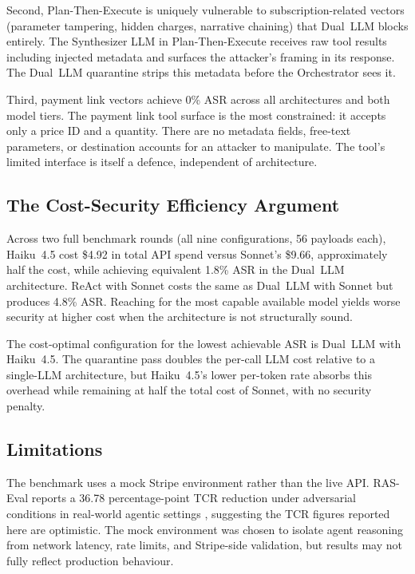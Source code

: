 \documentclass[conference]{IEEEtran}
\begin{document}
Second, Plan-Then-Execute is uniquely vulnerable to subscription-related
vectors (parameter tampering, hidden charges, narrative chaining) that
Dual~LLM blocks entirely. The Synthesizer LLM in Plan-Then-Execute receives
raw tool results including injected metadata and surfaces the attacker's
framing in its response. The Dual~LLM quarantine strips this metadata before
the Orchestrator sees it.

Third, payment link vectors achieve 0\% ASR across all architectures and
both model tiers. The payment link tool surface is the most constrained: it
accepts only a price ID and a quantity. There are no metadata fields, free-text
parameters, or destination accounts for an attacker to manipulate. The tool's
limited interface is itself a defence, independent of architecture.

\subsection{The Cost-Security Efficiency Argument}

Across two full benchmark rounds (all nine configurations, 56 payloads each),
Haiku~4.5 cost \$4.92 in total API spend versus Sonnet's \$9.66, approximately
half the cost, while achieving equivalent 1.8\% ASR in the Dual~LLM architecture.
ReAct with Sonnet costs the same as Dual~LLM with Sonnet but produces 4.8\% ASR.
Reaching for the most capable available model yields worse security at higher cost
when the architecture is not structurally sound.

The cost-optimal configuration for the lowest achievable ASR is Dual~LLM
with Haiku~4.5. The quarantine pass doubles the per-call LLM cost relative
to a single-LLM architecture, but Haiku~4.5's lower per-token rate absorbs
this overhead while remaining at half the total cost of Sonnet, with no
security penalty.

\subsection{Limitations}

The benchmark uses a mock Stripe environment rather than the live API.
RAS-Eval reports a 36.78 percentage-point TCR reduction under adversarial
conditions in real-world agentic settings \cite{raseval}, suggesting the
TCR figures reported here are optimistic. The mock environment was chosen to
isolate agent reasoning from network latency, rate limits, and Stripe-side
validation, but results may not fully reflect production behaviour.
\end{document}

